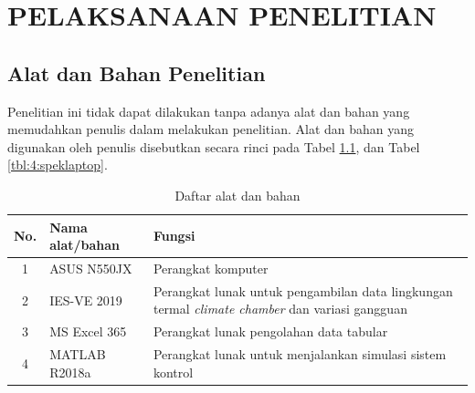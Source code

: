 \chapter{PELAKSANAAN PENELITIAN}
\label{pelaksanaan-penelitian}

\section{Alat dan Bahan Penelitian}
Penelitian ini tidak dapat dilakukan tanpa adanya alat dan bahan yang memudahkan penulis dalam melakukan penelitian. Alat dan bahan yang digunakan oleh penulis disebutkan secara rinci pada Tabel \ref{tbl:4:alatbahan}, dan Tabel \ref{tbl:4:speklaptop}.

\vspace{2em}
\begin{table}[!h]
	\caption{Daftar alat dan bahan}
	\label{tbl:4:alatbahan}
	\centering
	\begin{tabular}{|c|p{3.6cm}|p{9cm}|}
		\hline
		No. & Nama alat/bahan & Fungsi \\
		\hline
		1 & ASUS N550JX & Perangkat komputer \\ \hline
		2 & IES-VE 2019 & Perangkat lunak untuk pengambilan data lingkungan termal \textit{climate chamber} dan variasi gangguan \\ \hline
		3 & MS Excel 365 & Perangkat lunak pengolahan data tabular \\ \hline
		4 & MATLAB R2018a & Perangkat lunak untuk menjalankan simulasi sistem kontrol \\ \hline
	\end{tabular}
\end{table}

